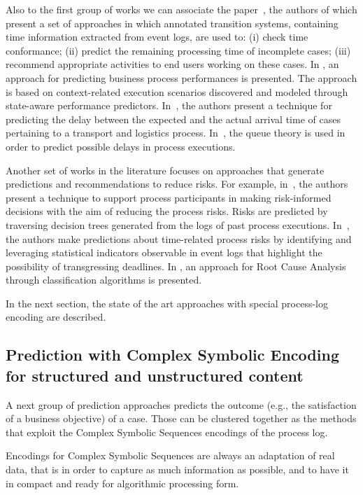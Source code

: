 Also to the first group of works we can associate the paper~\cite{DBLP:journals/is/AalstSS11}, the authors of which present a set of approaches in which annotated transition systems, containing time information extracted from event logs, are used to: (i) check time conformance;
(ii) predict the remaining processing time of incomplete cases; (iii) recommend appropriate activities to end users working on these cases. In \cite{Folino}, an approach for predicting business process performances is presented. The approach is based on context-related execution scenarios discovered and modeled through state-aware performance predictors. In~\cite{Metzgeretal12}, the authors present a technique for predicting the delay between the expected and the actual arrival time of cases pertaining to a transport and logistics process. In~\cite{Senderovichetal15}, the queue theory is used in order to predict possible delays in process executions.

Another set of works in the literature focuses on approaches that generate predictions and recommendations to reduce risks. For example, in~\cite{DBLP:conf/caise/ConfortiLRA13}, the authors present a technique to support process participants in making risk-informed decisions with the aim of reducing the process risks. Risks are predicted by traversing decision trees generated from the logs of past process executions. In~\cite{Pika}, the authors make predictions about time-related process risks by identifying and leveraging statistical indicators observable in event logs  that highlight the possibility of transgressing deadlines.
In \cite{suriadi}, an approach for Root Cause Analysis through classification algorithms is presented.

In the next section, the state of the art approaches with special process-log encoding are described.



\subsection{Prediction with Complex Symbolic Encoding for structured and unstructured content}

A next group of prediction approaches predicts the outcome (e.g., the satisfaction of a business objective) of a case. Those can be clustered together as the methods that exploit the Complex Symbolic Sequences encodings of the process log.

Encodings for Complex Symbolic Sequences are always an adaptation of real data, that is in order to capture as much information as possible, and to have it in compact and ready for algorithmic processing form. 

